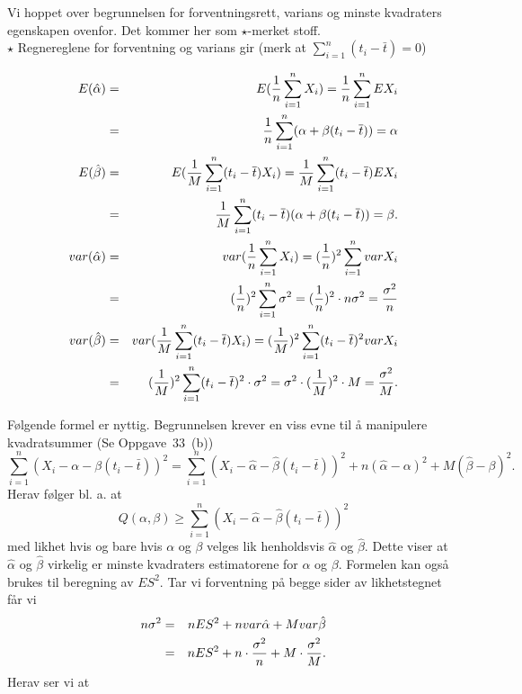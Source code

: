 Vi hoppet over begrunnelsen for forventningsrett, varians og minste
kvad\-raters egenskapen ovenfor. Det kommer her som $\star$-merket
stoff. \\[0.1cm]


$\star$ \small
\noindent  Regnereglene for forventning og varians gir
 (merk at $\sum_{i=1}^n (t_i -\bar t)=0$)

\begin{eqnarray*}
 E(\hat{\alpha})&=&E( {1\over n} \sum_{i=1}^n X_i) = {1\over n}\sum_{i=1}^n EX_i\\
         &=&{1\over n}\sum_{i=1}^n (\alpha + \beta (t_i - \bar t))=\alpha \\
  E(\hat{\beta})&=&E( {1\over M}\sum_{i=1}^n (t_i -\bar t)X_i)=
                           {1\over M}\sum_{i=1}^n (t_i - \bar t)EX_i\\
   &=&{1\over M}\sum_{i=1}^n (t_i-\bar t)(\alpha +\beta (t_i-\bar t))=\beta .\\
 var(\hat{\alpha})&=&var({1\over n}\sum_{i=1}^n X_i) =({1\over n})^2 \sum_{i=1}^n varX_i\\
    &=&({1\over n})^2\sum_{i=1}^n \sigma ^2=({1\over n})^2\cdot n\sigma ^2=
                                                    {\sigma ^2\over n} \\
var(\hat{\beta})&=&var( {1\over M}\sum_{i=1}^n (t_i - \bar t)X_i) =
     ({1\over M})^2\sum_{i=1}^n(t_i - \bar t)^2varX_i\\
  &=&({1\over M}) ^2\sum_{i=1}^n(t_i - \bar t)^2
     \cdot\sigma ^2=\sigma ^2\cdot ({1\over M}) ^2\cdot M={{\sigma}^2 \over M}.
\end{eqnarray*}

Følgende formel er nyttig. Begrunnelsen krever en viss evne
til å manipulere kvadratsummer (Se Oppgave~33~(b)) \\

\[ \sum_{i=1}^n(X_i- \alpha - \beta (t_i-\bar t))^2=\sum_{i=1}^n (X_i -
     \hat\alpha - \hat\beta(t_i - \bar t))^2 + n (\hat\alpha -
     \alpha)^2 + M(\hat\beta -\beta)^2.\]
Herav følger bl. a. at
\[ Q(\alpha ,\beta )\ge \sum_{i=1}^n(X_i -\hat{\alpha} -\hat{\beta}(t_i -
     \bar t))^2\]
med likhet hvis og bare hvis $\alpha$ og $\beta$ velges lik
henholdsvis $\hat\alpha$ og $\hat\beta$. Dette viser at
$\hat\alpha$ og $\hat\beta$ virkelig er minste kvadraters
estimatorene for $\alpha$ og $\beta$. Formelen kan også
brukes til beregning av $ES^2$. Tar vi forventning på begge
sider av likhetstegnet får vi
\begin{eqnarray*}
     n\sigma ^2&=&nES^2 +nvar\hat{\alpha} + Mvar \hat{\beta} \\
               &=&nES^2+ n\cdot{\sigma ^2\over n} + M\cdot{\sigma ^2\over M}.
\end{eqnarray*}
Herav ser vi at

